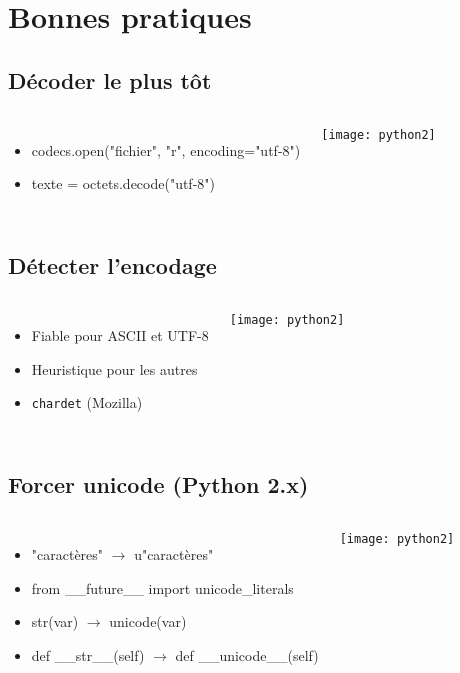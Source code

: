 \section{Bonnes pratiques}

\subsection{Décoder le plus tôt}
\frame
{
    \begin{columns}[c]
            \begin{itemize}
            \item codecs.open("fichier", "r", encoding="utf-8")
            \item texte = octets.decode("utf-8")
            \end{itemize}
            \texttt{[image: python2]}
    \end{columns}
}

\subsection{Détecter l'encodage}
\frame
{
    \begin{columns}[c]
            \begin{itemize}
            \item Fiable pour ASCII et UTF-8
            \item Heuristique pour les autres
            \item \texttt{chardet} (Mozilla)
            \end{itemize}
            \texttt{[image: python2]}
    \end{columns}
}

\subsection{Forcer unicode (Python 2.x)}
\frame
{
    \begin{columns}[c]
            \begin{itemize}
            \item "caractères" $\rightarrow$ u"caractères"
            \item from \_\_future\_\_ import unicode\_literals
            \item str(var) $\rightarrow$ unicode(var)
            \item def \_\_str\_\_(self) $\rightarrow$ def \_\_unicode\_\_(self)
            \end{itemize}
            \texttt{[image: python2]}
    \end{columns}
}


